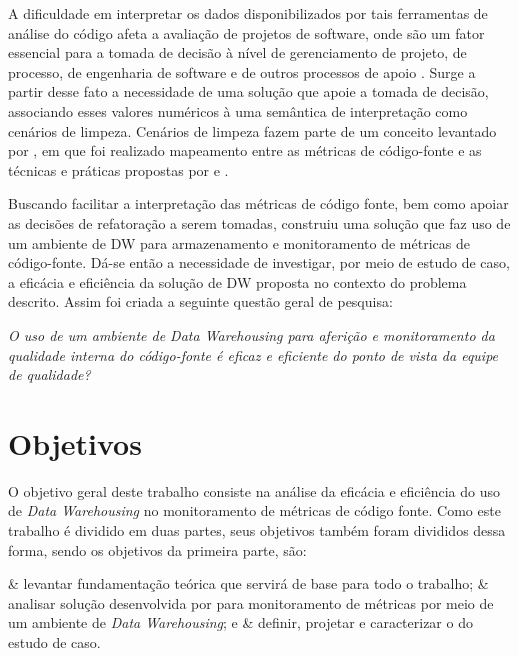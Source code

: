 A dificuldade em interpretar os dados disponibilizados por tais ferramentas de análise do código afeta a avaliação de projetos de software, onde são um fator essencial para a tomada de decisão à nível de gerenciamento de projeto, de processo, de engenharia de software e de outros processos de apoio \cite{pandian_software_2004}. Surge a partir desse fato a necessidade de uma solução que apoie a tomada de decisão, associando esses valores numéricos à uma semântica de interpretação como cenários de limpeza. Cenários de limpeza fazem parte de um conceito levantado por , em que foi realizado mapeamento entre as métricas de código-fonte e as técnicas e práticas propostas por  e .

Buscando facilitar a interpretação das métricas de código fonte, bem como apoiar as decisões de refatoração a serem tomadas,  construiu uma solução que faz uso de um ambiente de DW para armazenamento e monitoramento de métricas de código-fonte. Dá-se então a necessidade de investigar, por meio de estudo de caso, a eficácia e eficiência da solução de DW proposta no contexto do problema descrito. Assim foi criada a seguinte questão geral de pesquisa:

\textit{O uso de um ambiente de Data Warehousing para aferição e monitoramento da qualidade interna do código-fonte é eficaz e eficiente do ponto de vista da equipe de qualidade?}

\section{Objetivos}

O objetivo geral deste trabalho consiste na análise da eficácia e eficiência do uso de \textit{Data Warehousing} no monitoramento de métricas de código fonte. Como este trabalho é dividido em duas partes, seus objetivos também foram divididos dessa forma, sendo os objetivos da primeira parte, são:

\begin{easylist}[itemize]	
	
	& levantar fundamentação teórica que servirá de base para todo o trabalho;
	& analisar solução desenvolvida por  para monitoramento de métricas por meio de um ambiente de \textit{Data Warehousing}; e
	& definir, projetar e caracterizar o do estudo de caso.
	
	
	\end{easylist}	

